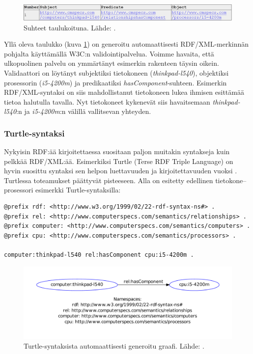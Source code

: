 \documentclass[finnish, 12pt, a4paper, elec, utf8, pdfa, online]{aaltothesis}
\begin{document}
\begin{figure}[htb]
\centering
\includegraphics[width=15cm]{images/RDF-valid.PNG}
\caption{Suhteet taulukoituna. Lähde: \cite{W3C_RDF_validator}. \label{images/RDF-valid}}
\end{figure}

Yllä oleva taulukko (kuva \ref{images/RDF-valid}) on generoitu automaattisesti RDF/XML-merkinnän pohjalta käyttämällä W3C:n validointipalvelua. Voimme havaita, että ulkopuolinen palvelu on ymmärtänyt esimerkin rakenteen täysin oikein. Validaattori on löytänyt subjektiksi tietokoneen (\textit{thinkpad-l540}), objektiksi prosessorin (\textit{i5-4200m}) ja predikaatiksi \textit{hasComponent}-suhteen. Esimerkin RDF/XML-syntaksi on siis mahdollistanut tietokoneen lukea ihmisen esittämää tietoa halutulla tavalla. Nyt tietokoneet kykenevät siis havaitsemaan \textit{thinkpad-l540}:n ja \textit{i5-4200m}:n välillä vallitsevan yhteyden.


\subsubsection{Turtle-syntaksi}
Nykyisin RDF:ää kirjoitettaessa suositaan paljon muitakin syntakseja kuin pelkkää RDF/XML:ää. Esimerkiksi Turtle (Terse RDF Triple Language) on hyvin suosittu syntaksi sen helpon luettavuuden ja kirjoitettavuuden vuoksi \cite{cambridge2}. Turtlessa toteamukset päättyvät pisteeseen. Alla on esitetty edellinen tietokone--prosessori esimerkki Turtle-syntaksilla:

\vskip 0.75cm
\begin{lstlisting}[style=codeblock,caption={Turtle syntaksiesimerkki.},captionpos=b,label={turtle_esim}]
@prefix rdf: <http://www.w3.org/1999/02/22-rdf-syntax-ns#> .
@prefix rel: <http://www.computerspecs.com/semantics/relationships> .
@prefix computer: <http://www.computerspecs.com/semantics/computers> .
@prefix cpu: <http://www.computerspecs.com/semantics/processors> .

computer:thinkpad-l540 rel:hasComponent cpu:i5-4200m .

\end{lstlisting}
\vskip 0.75cm

\begin{figure}[htb]
\centering
\includegraphics[width=15cm]{images/RDF-triplet2.pdf}
\vspace{-3pc}
\caption{Turtle-syntaksista automaattisesti generoitu graafi. Lähde: \cite{SeCo_RDF_validator}. \label{images/RDF-triplet2}}
\end{figure}
\end{document}
